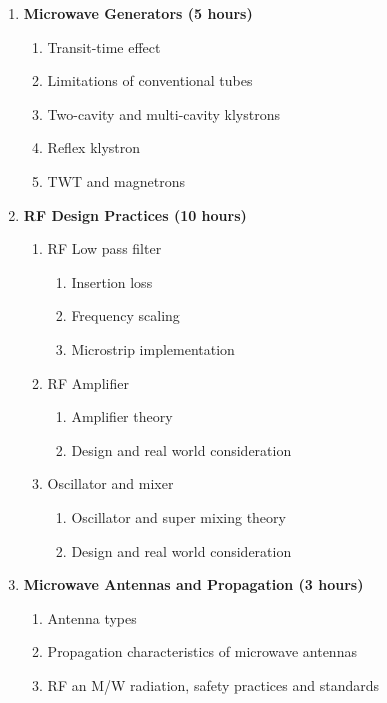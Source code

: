 \begin{enumerate}
  \item \textbf{Microwave Generators \hfill (5 hours)}
    \begin{enumerate}
      \item Transit-time effect
      \item Limitations of conventional tubes
      \item Two-cavity and multi-cavity klystrons
      \item Reflex klystron
      \item TWT and magnetrons
    \end{enumerate}
    \vs
    
  \item \textbf{RF Design Practices \hfill (10 hours)}
    \begin{enumerate}
      \item RF Low pass filter
        \begin{enumerate}
          \item Insertion loss
          \item Frequency scaling
          \item Microstrip implementation
        \end{enumerate}

      \item RF Amplifier
        \begin{enumerate}
          \item Amplifier theory
          \item Design and real world consideration
        \end{enumerate}

      \item Oscillator and mixer
        \begin{enumerate}
          \item Oscillator and super mixing theory
          \item Design and real world consideration
        \end{enumerate}
    \end{enumerate}
    \vs
    
  \item \textbf{Microwave Antennas and Propagation \hfill (3 hours)}
    \begin{enumerate}
      \item Antenna types
      \item Propagation characteristics of microwave antennas
      \item RF an M/W radiation, safety practices and standards
    \end{enumerate}
    \vs


\end{enumerate}
